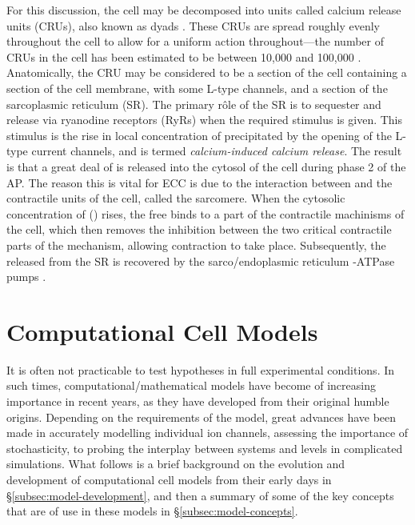 \documentclass[../thesis-main.tex]{subfiles}
\begin{document}
 For this discussion, the cell may be decomposed into units called calcium release units (CRUs), also known as dyads \citep{Cleemann1998}. These CRUs are spread roughly evenly throughout the cell to allow for a uniform action throughout---the number of CRUs in the cell has been estimated to be between 10,000 and 100,000 \citep{Cleemann1998,Greenstein2002}. Anatomically, the CRU may be considered to be a section of the cell containing a section of the cell membrane, with some L-type \ca{} channels, and a section of the sarcoplasmic reticulum (SR). The primary r\^ole of the SR is to sequester and release \ca{} via ryanodine receptors (RyRs) when the required stimulus is given. This stimulus is the rise in local concentration of \ca{} precipitated by the opening of the L-type \ca{} current channels, and is termed \emph{calcium-induced calcium release}. The result is that a great deal of \ca{} is released into the cytosol of the cell during phase 2 of the AP. The reason this is vital for ECC is due to the interaction between \ca{} and the contractile units of the cell, called the sarcomere. When the cytosolic concentration of \ca{} (\cai{}) rises, the free \ca{} binds to a part of the contractile machinisms of the cell, which then removes the inhibition between the two critical contractile parts of the mechanism, allowing contraction to take place. Subsequently, the \ca{} released from the SR is recovered by the sarco/endoplasmic reticulum \ca{}-ATPase pumps \citep{Franzini-Armstrong2005}.
 
 \section{Computational Cell Models}
 \label{sec:cell-models}
 It is often not practicable to test hypotheses in full experimental conditions. In such times, computational/mathematical models have become of increasing importance in recent years, as they have developed from their original humble origins. Depending on the requirements of the model, great advances have been made in accurately modelling individual ion channels, assessing the importance of stochasticity, to probing the interplay between systems and levels in complicated simulations. What follows is a brief background on the evolution and development of computational cell models from their early days in \S\ref{subsec:model-development}, and then a summary of some of the key concepts that are of use in these models in \S\ref{subsec:model-concepts}.
 
\end{document}
